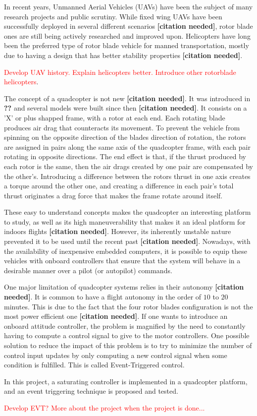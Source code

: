 In recent years, Unmanned Aerial Vehicles (UAVs) have been the subject of many research projects and public scrutiny. While fixed wing UAVs have been successfully deployed in several different scenarios \textbf{[citation needed]}, rotor blade ones are still being actively researched and improved upon. Helicopters have long been the preferred type of rotor blade vehicle for manned transportation, mostly due to having a design that has better stability properties \textbf{[citation needed]}. 

\textcolor{red}{Develop UAV history. Explain helicopters better. Introduce other rotorblade helicopters}.

The concept of a quadcopter is not new \textbf{[citation needed]}. It was introduced in \textbf{??} and several models were built since then \textbf{[citation needed]}. It consists on a 'X' or plus shapped frame, with a rotor at each end. Each rotating blade produces air drag that counteracts its movement. To prevent the vehicle from spinning on the opposite direction of the blades direction of rotation, the rotors are assigned in pairs along the same axis of the quadcopter frame, with each pair rotating in opposite directions. The end effect is that, if the thrust produced by each rotor is the same, then the air drags created by one pair are compensated by the other's. Introducing a difference between the rotors thrust in one axis creates a torque around the other one, and creating a difference in each pair's total thrust originates a drag force that makes the frame rotate around itself. 

These easy to understand concepts makes the quadcopter an interesting platform to study, as well as its high maneuverability that makes it an ideal platform for indoors flights \textbf{[citation needed]}. However, its inherently unstable nature prevented it to be used until the recent past \textbf{[citation needed]}. Nowadays, with the availability of inexpensive embedded computers, it is possible to equip these vehicles with onboard controllers that ensure that the system will behave in a desirable manner over a pilot (or autopilot) commands. 

One major limitation of quadcopter systems relies in their autonomy \textbf{[citation needed]}. It is common to have a flight autonomy in the order of $10$ to $20$ minutes. This is due to the fact that the four rotor blades configuration is not the most power efficient one \textbf{[citation needed]}. If one wants to introduce an onboard attitude controller, the problem is magnified by the need to constantly having to compute a control signal to give to the motor controllers. One possible solution to reduce the impact of this problem is to try to minimize the number of control input updates by only computing a new control signal when some condition is fulfilled. This is called Event-Triggered control. 

In this project, a saturating controller \cite{lohmann_attitude} is implemented in a quadcopter platform, and an event triggering technique is proposed and tested.

\textcolor{red}{Develop EVT? More about the project when the project is done...}
